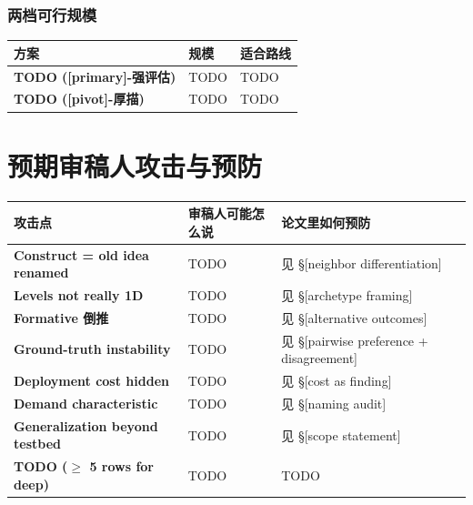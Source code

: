 \subsubsection*{两档可行规模}

\begin{center}
\small
\begin{tabularx}{\textwidth}{>{\bfseries}p{}X X}
\toprule
方案 & 规模 & 适合路线 \\
\midrule
TODO ([primary]-强评估) & TODO & TODO \\
TODO ([pivot]-厚描) & TODO & TODO \\
\bottomrule
\end{tabularx}
\end{center}


\section{预期审稿人攻击与预防}

\begin{center}
\small
\begin{longtable}{>{\bfseries}p{}p{}p{}}
\toprule
攻击点 & 审稿人可能怎么说 & 论文里如何预防 \\
\midrule
\endhead
Construct = old idea renamed & TODO & 见 §[neighbor differentiation] \\
Levels not really 1D & TODO & 见 §[archetype framing] \\
Formative 倒推 & TODO & 见 §[alternative outcomes] \\
Ground-truth instability & TODO & 见 §[pairwise preference + disagreement] \\
Deployment cost hidden & TODO & 见 §[cost as finding] \\
Demand characteristic & TODO & 见 §[naming audit] \\
Generalization beyond testbed & TODO & 见 §[scope statement] \\
TODO ($\geq$ 5 rows for deep) & TODO & TODO \\
\bottomrule
\end{longtable}
\end{center}


